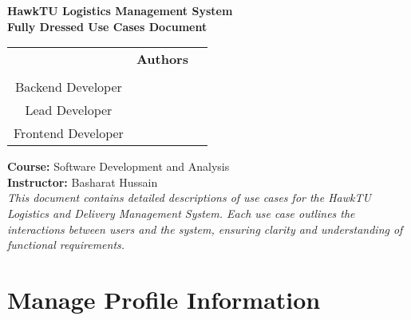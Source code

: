 \documentclass{article}
\begin{document}
\begin{titlepage}
    \centering
    {\Large \textbf{HawkTU Logistics Management System}} \\[8cm]
    
    
    {\huge \textbf{Fully Dressed Use Cases Document}} \\[6cm]

    \begin{tabular}{c c c}
    & {\Large \textbf{Authors}} & \\[0.5cm]
    \begin{minipage}{0.3\textwidth}
        \centering
        {\large Danish Haroon} \\[0.5cm]
        {\large Backend Developer}
    \end{minipage} &
    \begin{minipage}{0.3\textwidth}
        \centering
        {\large Arqam} \\[0.5cm]
        {\large Lead Developer}
    \end{minipage} &
    \begin{minipage}{0.3\textwidth}
        \centering
        {\large Tabish Noman} \\[0.5cm]
        {\large Frontend Developer}
    \end{minipage} \\
    \end{tabular}

    \vspace*{90px}

    {\large \textbf{Course:} Software Development and Analysis} \\[0.5cm]
    {\large \textbf{Instructor:} Basharat Hussain} \\[0.5cm]

    \vfill
    {\large \textit{This document contains detailed descriptions of use cases for the HawkTU Logistics and Delivery Management System. Each use case outlines the interactions between users and the system, ensuring clarity and understanding of functional requirements.}}
\end{titlepage}


\newpage

\centering\section*{Manage Profile Information}

\renewcommand{\arraystretch}{1.5} %
\renewcommand\labelitemi{$\vcenter{\hbox{\tiny$\bullet$}}$}
\end{document}
